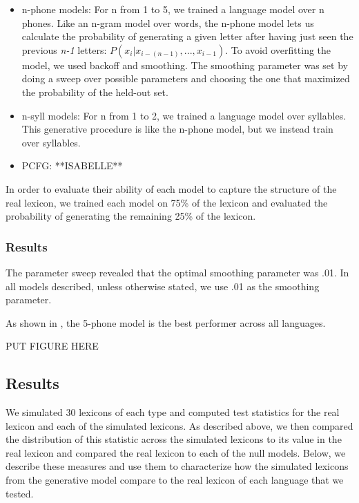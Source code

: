 \documentclass{article}
\begin{document}
\begin{itemize}

\item n-phone models: For n from 1 to 5, we trained a language model over n phones. Like an n-gram model over
words, the n-phone model lets us calculate the probability of generating a given letter after having just seen
the previous {\it n-1} letters: $P(x_i | x_{i - (n-1)},...,x_{i-1})$. To avoid overfitting the model, we used
backoff and smoothing. The smoothing parameter was set by doing a sweep over possible parameters and choosing
the one that maximized the probability of the held-out set.

\item n-syll models: For n from 1 to 2, we trained a language model over syllables. This generative procedure
is like the n-phone model, but we instead train over syllables.

\item PCFG: **ISABELLE**

\end{itemize}

In order to evaluate their ability of each model to capture the structure of the real lexicon, we trained each
model on 75\% of the lexicon and evaluated the probability of generating the remaining 25\% of the lexicon.

\subsubsection{Results} The parameter sweep revealed that the optimal smoothing parameter was .01. In all
models described, unless otherwise stated, we use .01 as the smoothing parameter.

As shown in , the 5-phone model is the best performer across all languages.

PUT FIGURE HERE


\subsection{Results}

We simulated 30 lexicons of each type and computed test statistics for the real lexicon and each of the
simulated lexicons. As described above, we then compared the distribution of this statistic across the
simulated lexicons to its value in the real lexicon and compared the real lexicon to each of the null models.
Below, we describe these measures and use them to characterize how the simulated lexicons from the generative
model compare to the real lexicon of each language that we tested.
\end{document}
